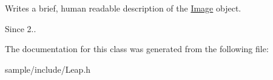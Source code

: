 Writes a brief, human readable description of the \hyperlink{class_leap_1_1_image}{Image} object.

\begin{DoxySince}{Since}
2.. 
\end{DoxySince}


The documentation for this class was generated from the following file\+:\begin{DoxyCompactItemize}
\item 
sample/include/Leap.\+h\end{DoxyCompactItemize}
